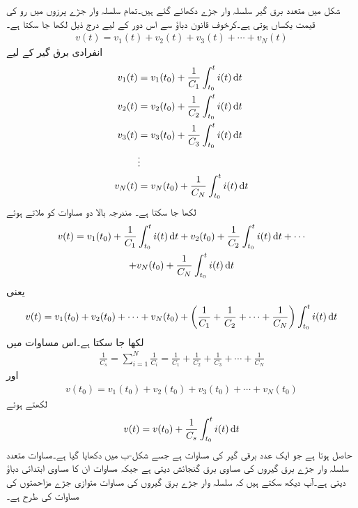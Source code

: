 شکل  میں متعدد برق گیر سلسلہ وار جڑے دکھائے گئے ہیں۔تمام سلسلہ وار جڑے پرزوں میں رو کی قیمت یکساں ہوتی ہے۔کرخوف قانون دباؤ سے اس دور کے لیے درج ذیل لکھا جا سکتا ہے۔
\begin{align*}
v(t)=v_1(t)+v_2(t)+v_3(t)+\cdots +v_N(t)
\end{align*}
انفرادی برق گیر کے لیے
\begin{align*}
v_1(t)&=v_1(t_0)+\frac{1}{C_1}\int_{t_0}^{t} i(t) \dif t\\
v_2(t)&=v_2(t_0)+\frac{1}{C_2}\int_{t_0}^{t} i(t) \dif t\\
v_3(t)&=v_3(t_0)+\frac{1}{C_3}\int_{t_0}^{t} i(t) \dif t\\
& \vdots\\
v_N(t)&=v_N(t_0)+\frac{1}{C_N}\int_{t_0}^{t} i(t) \dif t
\end{align*}
لکھا جا سکتا ہے۔ مندرجہ بالا دو مساوات کو ملاتے ہوئے
\begin{multline*}
v(t)=v_1(t_0)+\frac{1}{C_1}\int_{t_0}^{t} i(t) \dif t +v_2(t_0)+\frac{1}{C_2}\int_{t_0}^{t} i(t) \dif t +\cdots\\
+v_N(t_0)+\frac{1}{C_N}\int_{t_0}^{t} i(t) \dif t
\end{multline*}
یعنی
\begin{multline*}
v(t)=v_1(t_0)+v_2(t_0)+\cdots+v_N(t_0)+\left(\frac{1}{C_1}+\frac{1}{C_2} +\cdots + \frac{1}{C_N}\right)\int_{t_0}^{t} i(t) \dif t
\end{multline*}
لکھا جا سکتا ہے۔اس مساوات میں
\begin{align}\label{مساوات_امالہ_سلسلہ_وار_برق_گیر_کا_مساوی}
\frac{1}{C_s}=\sum_{i=1}^{N} \frac{1}{C_i}=\frac{1}{C_1}+\frac{1}{C_2}+\frac{1}{C_3}+\cdots+\frac{1}{C_N}
\end{align}
اور
\begin{align}\label{مساوات_امالہ_سلسلہ_وار_برق_گیر_کا_مساوی_ابتدائی_دباو}
v(t_0)=v_1(t_0)+v_2(t_0)+v_3(t_0)+\cdots+v_N(t_0)
\end{align}
لکھتے ہوئے
\begin{align}
v(t)=v(t_0)+\frac{1}{C_s} \int_{t_0}^{t} i(t)\dif t
\end{align}
حاصل ہوتا ہے جو ایک عدد برقی گیر کی مساوات ہے جسے شکل-ب میں دکھایا گیا ہے۔مساوات  متعدد سلسلہ وار جڑے برق گیروں کی مساوی برق گنجائش  دیتی ہے جبکہ مساوات  ان کا مساوی ابتدائی دباؤ دیتی ہے۔آپ دیکھ سکتے ہیں کہ سلسلہ وار جڑے برق گیروں کی مساوات متوازی جڑے مزاحمتوں کی مساوات کی طرح ہے۔

